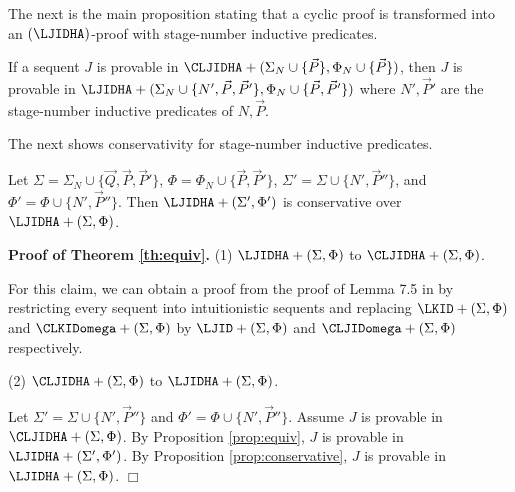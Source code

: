 The next is the main proposition stating that a cyclic proof is transformed
into an $(\LJIDHA)$-proof with stage-number inductive predicates.
\begin{Prop}\label{prop:equiv}
If a sequent $J$ is provable in
$\CLJIDHA+(\Sigma_N \cup \{ \Vec P \}, \Phi_N \cup \{ \Vec P \})$,
then
$J$ is provable in 
$\LJIDHA+(\Sigma_N \cup \{N', \Vec P, \Vec P' \}, \Phi_N \cup \{ \Vec P, \Vec P' \})$
where $N', \Vec P'$ are the stage-number inductive predicates 
of $N, \Vec P$.
\end{Prop}

The next shows conservativity for 
stage-number inductive predicates.
\begin{Prop}\label{prop:conservative}
Let 
$
\Sigma = \Sigma_N \cup \{\Vec Q,\Vec P, \Vec P'\}$,
$\Phi = \Phi_N \cup \{ \Vec P, \Vec P'\}$,
$\Sigma' = \Sigma \cup \{N',\Vec P''\}$, and
$\Phi' = \Phi \cup \{N', \Vec P''\}$.
Then
$\LJIDHA+(\Sigma',\Phi')$
is conservative over
$\LJIDHA+(\Sigma,\Phi)$.
\end{Prop}

\noindent
{\bf Proof of Theorem \ref{th:equiv}.}
(1) $\LJIDHA+(\Sigma,\Phi)$ to $\CLJIDHA+(\Sigma,\Phi)$.

For this claim, we can obtain a proof 
from the proof of Lemma 7.5 in \cite{Brotherston11a}
by restricting every sequent into intuitionistic sequents
and replacing
$\LKID+(\Sigma,\Phi)$ and $\CLKIDomega+(\Sigma,\Phi)$ by
$\LJID+(\Sigma,\Phi)$ and $\CLJIDomega+(\Sigma,\Phi)$ respectively.

(2) $\CLJIDHA+(\Sigma,\Phi)$ to $\LJIDHA+(\Sigma,\Phi)$.

Let
$\Sigma' = \Sigma \cup \{N',\Vec P''\}$ and
$\Phi' = \Phi \cup \{N', \Vec P''\}$.
Assume $J$ is provable in $\CLJIDHA+(\Sigma,\Phi)$.
By Proposition \ref{prop:equiv},
$J$ is provable in $\LJIDHA+(\Sigma',\Phi')$.
By Proposition \ref{prop:conservative},
$J$ is provable in $\LJIDHA+(\Sigma,\Phi)$.
$\Box$

